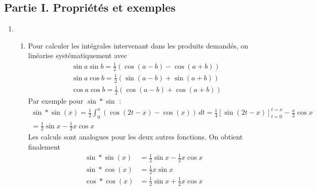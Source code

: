\subsection*{Partie I. Propriétés et exemples}
\begin{enumerate}
 \item
\begin{enumerate}
 \item Pour calculer les intégrales intervenant dans les produits demandés, on linéarise systématiquement avec
\begin{align*}
 &\sin a \sin b = \frac{1}{2}\left(\cos(a-b) - \cos(a+b) \right)\\ 
 &\sin a \cos b = \frac{1}{2}\left(\sin(a-b) + \sin(a+b) \right)\\
 &\cos a \cos b = \frac{1}{2}\left(\cos(a-b) + \cos(a+b) \right)
\end{align*}
Par exemple pour $\sin * \sin$ :
\begin{multline*}
 \sin * \sin (x) = \frac{1}{2}\int_0^x\left(\cos(2t-x)-\cos(x) \right)\,dt
= \frac{1}{4}\left[\sin(2t-x) \right]_{t=0}^{t=x}-\frac{x}{2}\cos x \\
= \frac{1}{2}\sin x -\frac{1}{2}x\cos x   
\end{multline*}
Les calculs sont analogues pour les deux autres fonctions. On obtient finalement
\begin{align*}
 \sin * \sin (x) &= \frac{1}{2}\sin x -\frac{1}{2}x\cos x \\
 \sin * \cos (x) &= \frac{1}{2}x\sin x \\
 \cos * \cos (x) &= \frac{1}{2}\sin x +\frac{1}{2}x\cos x
\end{align*}


\end{enumerate}
\end{enumerate}
